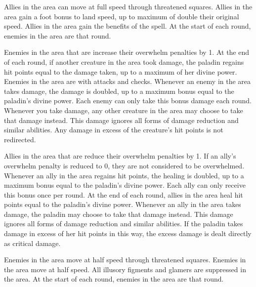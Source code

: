     Allies in the area can move at full speed through threatened squares.
    Allies in the area gain a  foot bonus to land speed, up to maximum of double their original speed.
    Allies in the area gain the benefits of the  spell.
    At the start of each round, enemies in the area are \disoriented that round.

    Enemies in the area that are  increase their overwhelm penalties by 1.
    At the end of each round, if another creature in the area took damage, the paladin regains hit points equal to the damage taken, up to a maximum of her divine power.
    Enemies in the area are \impaired with attacks and checks.
    Whenever an enemy in the area takes damage, the damage is doubled, up to a maximum bonus equal to the paladin's divine power.
    Each enemy can only take this bonus damage each round.
    Whenever you take damage, any other creature in the area may choose to take that damage instead.
    This damage ignores all forms of damage reduction and similar abilities.
    Any damage in excess of the creature's hit points is not redirected.

    Allies in the area that are  reduce their overwhelm penalties by 1.
    If an ally's overwhelm penalty is reduced to 0, they are not considered to be overwhelmed.
    Whenever an ally in the area regains hit points, the healing is doubled, up to a maximum bonus equal to the paladin's divine power.
    Each ally can only receive this bonus once per round.
    At the end of each round, allies in the area heal hit points equal to the paladin's divine power.
    Whenever an ally in the area takes damage, the paladin may choose to take that damage instead.
    This damage ignores all forms of damage reduction and similar abilities.
    If the paladin takes damage in excess of her hit points in this way, the excess damage is dealt directly as critical damage.

    Enemies in the area move at half speed through threatened squares.
    Enemies in the area move at half speed.
    All illusory figments and glamers are suppressed in the area.
    At the start of each round, enemies in the area are \immobilized that round.

